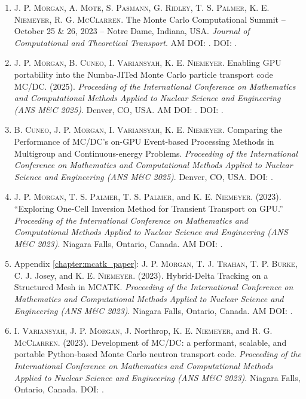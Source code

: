 \begin{enumerate}
    \item \textsc{J. P. Morgan}, \textsc{A. Mote}, \textsc{S. Pasmann}, \textsc{ G. Ridley}, \textsc{T. S. Palmer}, \textsc{K. E. Niemeyer}, \textsc{R. G. McClarren}. The Monte Carlo Computational Summit -- October 25 \& 26, 2023 -- Notre Dame, Indiana, USA. \emph{Journal of Computational and Theoretical Transport}. AM DOI: . DOI: .

    \item \textsc{J. P. Morgan}, \textsc{B. Cuneo}, \textsc{I. Variansyah}, \textsc{K. E. Niemeyer}. Enabling GPU portability into the Numba-JITed Monte Carlo particle transport code MC/DC. (2025). \emph{Proceeding of the International Conference on Mathematics and Computational Methods Applied to Nuclear Science and Engineering (ANS M\&C 2025)}. Denver, CO, USA. AM DOI: . DOI: .

    \item \textsc{B. Cuneo}, \textsc{J. P. Morgan}, \textsc{I. Variansyah}, \textsc{K. E. Niemeyer}. Comparing the Performance of MC/DC's on-GPU Event-based Processing Methods in Multigroup and Continuous-energy Problems. \emph{Proceeding of the International Conference on Mathematics and Computational Methods Applied to Nuclear Science and Engineering (ANS M\&C 2025)}. Denver, CO, USA. DOI: .

    \item \textsc{J. P. Morgan}, \textsc{T. S. Palmer}, \textsc{T. S. Palmer}, and \textsc{K. E. Niemeyer}. (2023). “Exploring One-Cell Inversion Method for Transient Transport on GPU.” \emph{Proceeding of the International Conference on Mathematics and Computational Methods Applied to Nuclear Science and Engineering (ANS M\&C 2023)}. Niagara Falls, Ontario, Canada. AM DOI: .

    \item Appendix \ref{chapter:mcatk_paper}: \textsc{J. P. Morgan}, \textsc{T. J. Trahan}, \textsc{T. P. Burke}, {C. J. Josey}, and \textsc{K. E. Niemeyer}. (2023). Hybrid-Delta Tracking on a Structured Mesh in MCATK. \emph{Proceeding of the International Conference on Mathematics and Computational Methods Applied to Nuclear Science and Engineering (ANS M\&C 2023)}. Niagara Falls, Ontario, Canada. AM DOI: .

    \item \textsc{I. Variansyah}, \textsc{J. P. Morgan}, {J. Northrop}, \textsc{K. E. Niemeyer}, and \textsc{R. G. McClarren}. (2023). Development of MC/DC: a performant, scalable, and portable Python-based Monte Carlo neutron transport code. \emph{Proceeding of the International Conference on Mathematics and Computational Methods Applied to Nuclear Science and Engineering (ANS M\&C 2023)}. Niagara Falls, Ontario, Canada. DOI: .
    

\end{enumerate}
